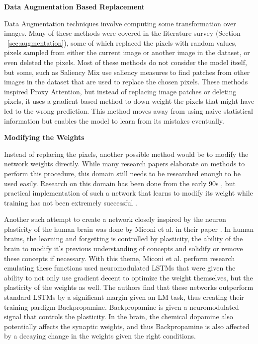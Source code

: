 \documentclass[a4paper,11pt,openright]{book}
\begin{document}
\textbf{Data Augmentation Based Replacement}

Data Augmentation techniques involve computing some transformation over images. Many of these methods were covered in the literature survey (Section ~\ref{sec:augmentation}), some of which replaced the pixels with random values, pixels sampled from either the current image or another image in the dataset, or even deleted the pixels. Most of these methods do not consider the model itself, but some, such as Saliency Mix \cite{uddinSaliencyMixSaliencyGuided2021} use saliency measures to find patches from other images in the dataset that are used to replace the chosen pixels.
These methods inspired Proxy Attention, but instead of replacing image patches or deleting pixels, it uses a gradient-based method to down-weight the pixels that might have led to the wrong prediction. This method moves away from using naive statistical information but enables the model to learn from its mistakes eventually.



\textbf{Modifying the Weights}

Instead of replacing the pixels, another possible method would be to modify the network weights directly. While many research papers elaborate on methods to perform this procedure, this domain still needs to be researched enough to be used easily. Research on this domain has been done from the early 90s \cite{schmidhuberSelfReferentialWeightMatrix1993}, but practical implementation of such a network that learns to modify its weight while training has not been extremely successful \cite{irieModernSelfReferentialWeight2022}. 

Another such attempt to create a network closely inspired by the neuron plasticity of the human brain was done by Miconi et al. in their paper \cite{miconiBackpropamineTrainingSelfmodifying2020}. In human brains, the learning and forgetting is controlled by plasticity, the ability of the brain to modify it's previous understanding of concepts and solidify or remove these concepts if necessary. With this theme, Miconi et al. perform research emulating these functions used neuromodulated LSTMs that were given the ability to not only use gradient decent to optimize the weight themselves, but the plasticity of the weights as well. The authors find that these networks outperform standard LSTMs by a significant margin given an LM task, thus creating their training pardigm Backpropamine. Backpropamine is given a neuromodulated signal that controls the plasticity. In the brain, the chemical dopamine also potentially affects the synaptic weights, and thus Backpropamine is also affected by a decaying change in the weights given the right conditions.
\end{document}
